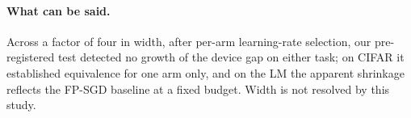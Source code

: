 \paragraph{What can be said.} Across a factor of four in width, after per-arm learning-rate selection, our pre-registered test
detected no growth of the device gap on either task; on CIFAR it established equivalence for one arm only, and on the LM the
apparent shrinkage reflects the FP-SGD baseline at a fixed budget. Width is not resolved by this study.


